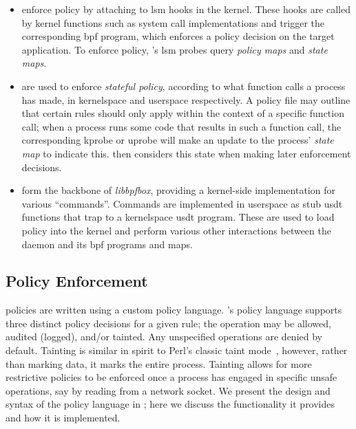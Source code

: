 \begin{itemize}
  \item \textbf{} enforce policy by attaching to \gls{lsm} hooks in the
  kernel. These hooks are called by kernel functions such as system call implementations
  and trigger the corresponding \gls{bpf} program, which enforces a policy decision on the
  target application. To enforce policy, \bpfbox{}'s \gls{lsm} probes query \textit{policy
  maps} and \textit{state maps}.

  \item \textbf{} are used to enforce \textit{stateful policy},
  according to what function calls a process has made, in kernelspace and userspace
  respectively. A \bpfbox{} policy file may outline that certain rules should only apply
  within the context of a specific function call; when a process runs some code that
  results in such a function call, the corresponding kprobe or uprobe will make an update
  to the process' \textit{state map} to indicate this. \bpfbox{} then considers this state
  when making later enforcement decisions.

  \item \textbf{} form the backbone of \textit{libbpfbox},
  providing a kernel-side implementation for various \enquote{commands}. Commands are
  implemented in userspace as stub \gls{usdt} functions that trap to a kernelspace
  \gls{usdt} program. These are used to load policy into the kernel and perform various
  other interactions between the daemon and its \gls{bpf} programs and maps.
\end{itemize}

\subsection{\bpfbox{} Policy Enforcement}%
\label{ss:bpfbox-enforcement}

\bpfbox{} policies are written using a custom policy language.  \bpfbox{}'s policy
language supports three distinct policy decisions for a given rule; the operation may be
allowed, audited (logged), and/or tainted.  Any unspecified operations are denied by
default. Tainting is similar in spirit to Perl's classic taint mode~\cite{hurst2004_perl},
however, rather than marking data, it marks the entire process.  Tainting allows for more
restrictive policies to be enforced once a process has engaged in specific unsafe
operations, say by reading from a network socket.  We present the design and syntax of the
\bpfbox{} policy language in ; here we discuss the functionality
it provides and how it is implemented.


